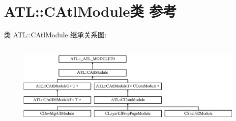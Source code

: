 \hypertarget{class_a_t_l_1_1_c_atl_module}{}\section{A\+TL\+:\+:C\+Atl\+Module类 参考}
\label{class_a_t_l_1_1_c_atl_module}
类 A\+TL\+:\+:C\+Atl\+Module 继承关系图\+:\begin{figure}[H]
\begin{center}
\leavevmode
\includegraphics[height=4.204205cm]{class_a_t_l_1_1_c_atl_module}
\end{center}
\end{figure}
